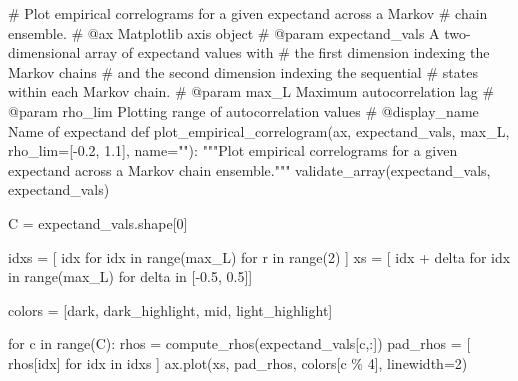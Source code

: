 \documentclass[
  letterpaper,
  DIV=11,
  numbers=noendperiod]{scrartcl}
\newenvironment{Shaded}{\begin{snugshade}}{\end{snugshade}}
\newcommand{\BuiltInTok}[1]{\textcolor[rgb]{0.00,0.23,0.31}{#1}}
\newcommand{\CommentTok}[1]{\textcolor[rgb]{0.37,0.37,0.37}{#1}}
\newcommand{\ControlFlowTok}[1]{\textcolor[rgb]{0.00,0.23,0.31}{#1}}
\newcommand{\DecValTok}[1]{\textcolor[rgb]{0.68,0.00,0.00}{#1}}
\newcommand{\FloatTok}[1]{\textcolor[rgb]{0.68,0.00,0.00}{#1}}
\newcommand{\KeywordTok}[1]{\textcolor[rgb]{0.00,0.23,0.31}{#1}}
\newcommand{\NormalTok}[1]{\textcolor[rgb]{0.00,0.23,0.31}{#1}}
\newcommand{\OperatorTok}[1]{\textcolor[rgb]{0.37,0.37,0.37}{#1}}
\newcommand{\StringTok}[1]{\textcolor[rgb]{0.13,0.47,0.30}{#1}}
\begin{document}
\begin{Shaded}
\begin{Highlighting}[]
\CommentTok{\# Plot empirical correlograms for a given expectand across a Markov}
\CommentTok{\# chain ensemble.}
\CommentTok{\# @ax Matplotlib axis object}
\CommentTok{\# @param expectand\_vals A two{-}dimensional array of expectand values with}
\CommentTok{\#                       the first dimension indexing the Markov chains}
\CommentTok{\#                       and the second dimension indexing the sequential}
\CommentTok{\#                       states within each Markov chain.}
\CommentTok{\# @param max\_L Maximum autocorrelation lag}
\CommentTok{\# @param rho\_lim Plotting range of autocorrelation values}
\CommentTok{\# @display\_name Name of expectand}
\KeywordTok{def}\NormalTok{ plot\_empirical\_correlogram(ax,}
\NormalTok{                               expectand\_vals,}
\NormalTok{                               max\_L,}
\NormalTok{                               rho\_lim}\OperatorTok{=}\NormalTok{[}\OperatorTok{{-}}\FloatTok{0.2}\NormalTok{, }\FloatTok{1.1}\NormalTok{],}
\NormalTok{                               name}\OperatorTok{=}\StringTok{""}\NormalTok{):}
  \CommentTok{"""Plot empirical correlograms for a given expectand across a Markov}
\CommentTok{     chain ensemble."""}
\NormalTok{  validate\_array(expectand\_vals, }\StringTok{\textquotesingle{}expectand\_vals\textquotesingle{}}\NormalTok{)}

\NormalTok{  C }\OperatorTok{=}\NormalTok{ expectand\_vals.shape[}\DecValTok{0}\NormalTok{]}
  
\NormalTok{  idxs }\OperatorTok{=}\NormalTok{ [ idx }\ControlFlowTok{for}\NormalTok{ idx }\KeywordTok{in} \BuiltInTok{range}\NormalTok{(max\_L) }\ControlFlowTok{for}\NormalTok{ r }\KeywordTok{in} \BuiltInTok{range}\NormalTok{(}\DecValTok{2}\NormalTok{) ]}
\NormalTok{  xs }\OperatorTok{=}\NormalTok{ [ idx }\OperatorTok{+}\NormalTok{ delta }\ControlFlowTok{for}\NormalTok{ idx }\KeywordTok{in} \BuiltInTok{range}\NormalTok{(max\_L) }\ControlFlowTok{for}\NormalTok{ delta }\KeywordTok{in}\NormalTok{ [}\OperatorTok{{-}}\FloatTok{0.5}\NormalTok{, }\FloatTok{0.5}\NormalTok{]]}
  
\NormalTok{  colors }\OperatorTok{=}\NormalTok{ [dark, dark\_highlight, mid, light\_highlight]}
  
  \ControlFlowTok{for}\NormalTok{ c }\KeywordTok{in} \BuiltInTok{range}\NormalTok{(C):}
\NormalTok{    rhos }\OperatorTok{=}\NormalTok{ compute\_rhos(expectand\_vals[c,:])}
\NormalTok{    pad\_rhos }\OperatorTok{=}\NormalTok{ [ rhos[idx] }\ControlFlowTok{for}\NormalTok{ idx }\KeywordTok{in}\NormalTok{ idxs ]}
\NormalTok{    ax.plot(xs, pad\_rhos, colors[c }\OperatorTok{\%} \DecValTok{4}\NormalTok{], linewidth}\OperatorTok{=}\DecValTok{2}\NormalTok{)}
  

\end{Highlighting}
\end{Shaded}
\end{document}
